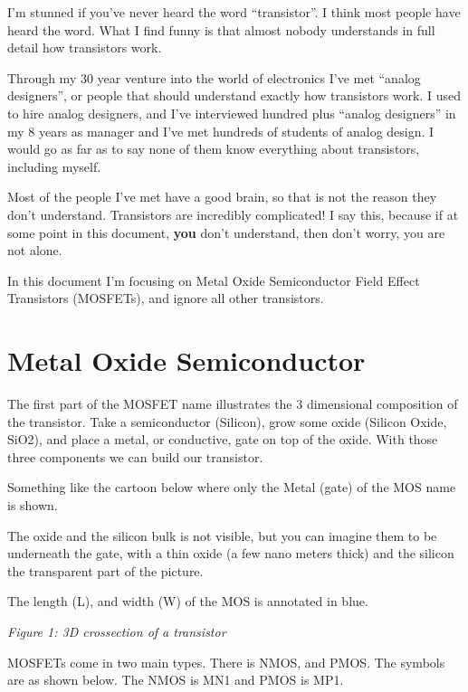 I'm stunned if you've never heard the word ``transistor''. I think most
people have heard the word. What I find funny is that almost nobody
understands in full detail how transistors work.

Through my 30 year venture into the world of electronics I've met
``analog designers'', or people that should understand exactly how
transistors work. I used to hire analog designers, and I've interviewed
hundred plus ``analog designers'' in my 8 years as manager and I've met
hundreds of students of analog design. I would go as far as to say none
of them know everything about transistors, including myself.

Most of the people I've met have a good brain, so that is not the reason
they don't understand. Transistors are incredibly complicated! I say
this, because if at some point in this document, \textbf{you} don't
understand, then don't worry, you are not alone.

In this document I'm focusing on Metal Oxide Semiconductor Field Effect
Transistors (MOSFETs), and ignore all other transistors.

\section{Metal Oxide Semiconductor}\label{metal-oxide-semiconductor}

The first part of the MOSFET name illustrates the 3 dimensional
composition of the transistor. Take a semiconductor (Silicon), grow some
oxide (Silicon Oxide, SiO2), and place a metal, or conductive, gate on
top of the oxide. With those three components we can build our
transistor.

Something like the cartoon below where only the Metal (gate) of the MOS
name is shown.

The oxide and the silicon bulk is not visible, but you can imagine them
to be underneath the gate, with a thin oxide (a few nano meters thick)
and the silicon the transparent part of the picture.

The length (L), and width (W) of the MOS is annotated in blue.


{
\centering
{}
}

\emph{Figure 1: 3D crossection of a transistor}

MOSFETs come in two main types. There is NMOS, and PMOS. The symbols are
as shown below. The NMOS is MN1 and PMOS is MP1.


